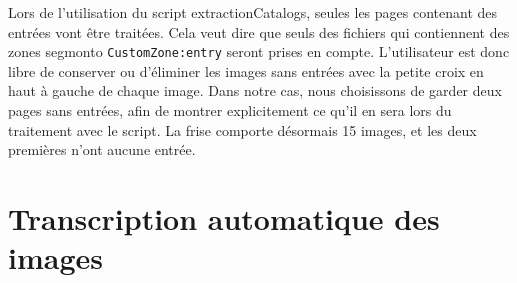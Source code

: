 \documentclass[a4paper,12pt,twoside]{book}
\begin{document}
Lors de l'utilisation du script extractionCatalogs, seules les pages contenant des entrées vont être traitées. Cela veut dire que seuls des fichiers qui contiennent des zones segmonto \texttt{CustomZone:entry} seront prises en compte. L'utilisateur est donc libre de conserver ou d'éliminer les images sans entrées avec la petite croix en haut à gauche de chaque image. Dans notre cas, nous choisissons de garder deux pages sans entrées, afin de montrer explicitement ce qu'il en sera lors du traitement avec le script. La frise comporte désormais 15 images, et les deux premières n'ont aucune entrée. 

\section{Transcription automatique des images}
\end{document}
